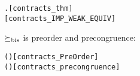 \begin{frame}[fragile]
\begin{scriptsize}
\begin{alltt}
\HOLTokenTurnstile{}  \HOLSymConst{\HOLTokenContracts{}}  \HOLSymConst{\HOLTokenEquiv{}} \HOLSymConst{\HOLTokenExists{}}.    \HOLSymConst{\HOLTokenConj{}}  \hfill{[contracts_thm]}
\HOLTokenTurnstile{}  \HOLSymConst{\HOLTokenContracts{}}  \HOLSymConst{\HOLTokenImp{}}  \HOLSymConst{\HOLTokenWeakEQ} \hfill{[contracts_IMP_WEAK_EQUIV]}
\end{alltt}

$\mathrel{\succeq_\mathrm{bis}}$ is preorder and precongruence:
\begin{alltt}
\HOLTokenTurnstile{}  ()\hfill{[contracts_PreOrder]}
\HOLTokenTurnstile{}  ()\hfill{[contracts_precongruence]}
\end{alltt}
\end{scriptsize}
\end{frame}

